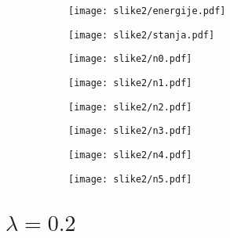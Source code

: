 \documentclass{article}
\begin{document}
\begin{figure}[H]
\begin{subfigure}{.5\textwidth}
\texttt{[image: slike2/energije.pdf]}
\end{subfigure}
\begin{subfigure}{.5\textwidth}
\texttt{[image: slike2/stanja.pdf]}
\end{subfigure}
\end{figure}
\begin{figure}[H]
\begin{subfigure}{.5\textwidth}
\texttt{[image: slike2/n0.pdf]}
\end{subfigure}
\begin{subfigure}{.5\textwidth}
\texttt{[image: slike2/n1.pdf]}
\end{subfigure}
\end{figure}
\begin{figure}[H]
\begin{subfigure}{.5\textwidth}
\texttt{[image: slike2/n2.pdf]}
\end{subfigure}
\begin{subfigure}{.5\textwidth}
\texttt{[image: slike2/n3.pdf]}
\end{subfigure}
\end{figure}
\begin{figure}[H]
\begin{subfigure}{.5\textwidth}
\texttt{[image: slike2/n4.pdf]}
\end{subfigure}
\begin{subfigure}{.5\textwidth}
\texttt{[image: slike2/n5.pdf]}
\end{subfigure}
\end{figure}	

\section{$\lambda = 0.2$}
\end{document}

